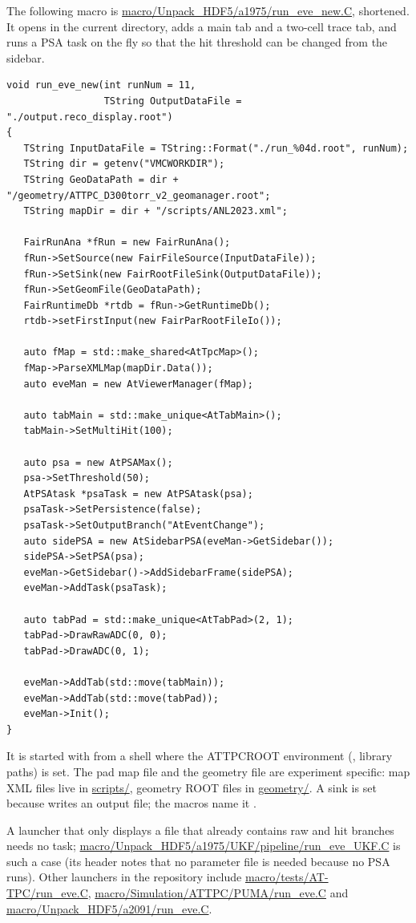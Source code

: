 The following macro is \url{macro/Unpack_HDF5/a1975/run_eve_new.C}, shortened. It opens
 in the current directory, adds a main tab and a two-cell trace tab, and runs
a PSA task on the fly so that the hit threshold can be changed from the sidebar.
\begin{verbatim}
void run_eve_new(int runNum = 11,
                 TString OutputDataFile = "./output.reco_display.root")
{
   TString InputDataFile = TString::Format("./run_%04d.root", runNum);
   TString dir = getenv("VMCWORKDIR");
   TString GeoDataPath = dir + "/geometry/ATTPC_D300torr_v2_geomanager.root";
   TString mapDir = dir + "/scripts/ANL2023.xml";

   FairRunAna *fRun = new FairRunAna();
   fRun->SetSource(new FairFileSource(InputDataFile));
   fRun->SetSink(new FairRootFileSink(OutputDataFile));
   fRun->SetGeomFile(GeoDataPath);
   FairRuntimeDb *rtdb = fRun->GetRuntimeDb();
   rtdb->setFirstInput(new FairParRootFileIo());

   auto fMap = std::make_shared<AtTpcMap>();
   fMap->ParseXMLMap(mapDir.Data());
   auto eveMan = new AtViewerManager(fMap);

   auto tabMain = std::make_unique<AtTabMain>();
   tabMain->SetMultiHit(100);

   auto psa = new AtPSAMax();
   psa->SetThreshold(50);
   AtPSAtask *psaTask = new AtPSAtask(psa);
   psaTask->SetPersistence(false);
   psaTask->SetOutputBranch("AtEventChange");
   auto sidePSA = new AtSidebarPSA(eveMan->GetSidebar());
   sidePSA->SetPSA(psa);
   eveMan->GetSidebar()->AddSidebarFrame(sidePSA);
   eveMan->AddTask(psaTask);

   auto tabPad = std::make_unique<AtTabPad>(2, 1);
   tabPad->DrawRawADC(0, 0);
   tabPad->DrawADC(0, 1);

   eveMan->AddTab(std::move(tabMain));
   eveMan->AddTab(std::move(tabPad));
   eveMan->Init();
}
\end{verbatim}
It is started with  from a shell where the ATTPCROOT
environment (, library paths) is set. The pad map file and the geometry file are
experiment specific: map XML files live in \url{scripts/}, geometry ROOT files in
\url{geometry/}. A sink is set because  writes an output file; the macros
name it .

A launcher that only displays a file that already contains raw and hit branches needs no task;
\url{macro/Unpack_HDF5/a1975/UKF/pipeline/run_eve_UKF.C} is such a case (its header notes that no
parameter file is needed because no PSA runs). Other launchers in the repository include
\url{macro/tests/AT-TPC/run_eve.C}, \url{macro/Simulation/ATTPC/PUMA/run_eve.C} and
\url{macro/Unpack_HDF5/a2091/run_eve.C}.

